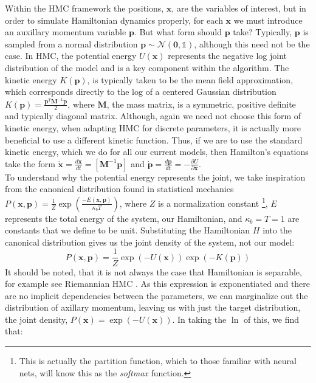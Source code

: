 \documentclass[twoside]{article}
\begin{document}
Within the HMC framework the positions, $\textbf{x}$, are the variables of interest, but in order to simulate Hamiltonian dynamics properly, for each $\textbf{x}$ we must introduce an auxillary momentum variable $\textbf{p}$. But what form should $\textbf{p}$ take? Typically, $\textbf{p}$ is sampled from a normal distribution $\textbf{p} \sim \mathcal{N}(\textbf{0}, \mathds{1})$, although this need not be the case. In HMC, the potential energy $U(\textbf{x})$ represents the negative log joint distribution of the model and is a key component within the algorithm.  The kinetic energy $K(\textbf{p})$, is typically taken to be the mean field approximation, which corresponds directly to the log of a centered Gaussian distribution $K(\textbf{p}) = \frac{\textbf{p}^{T} \textbf{M}^{-1} \textbf{p}}{2}$, where $\textbf{M}$, the mass matrix, is a symmetric, positive definite and typically diagonal matrix. Although, again we need not choose this form of kinetic energy, when adapting HMC for discrete parameters, it is actually more beneficial to use a different kinetic function\citep{nishimura2017discontinuous}. Thus, if we are to use the standard kinetic energy, which we do for all our current models, then Hamilton's equations take the form $
\dot{\textbf{x}} = \frac{d\textbf{x}}{dt} = [\textbf{M}^{-1}\textbf{p}]$ and $ \dot{\textbf{p}} = \frac{d\textbf{p}}{dt} = -\frac{\partial U}{\partial \textbf{x}}$.\\
To understand why the potential energy represents the joint, we take inspiration from the canonical distribution found in statistical mechanics
$P(\textbf{x},\textbf{p}) = \frac{1}{Z}\exp\left(\frac{-E(\textbf{x},\textbf{p})}{\kappa_{b}T}\right)$,
where $Z$ is a normalization constant \footnote{This is actually the partition function, which to those familiar with neural nets, will know this as the \textit{softmax} function. }, $E$ represents the total energy of the system, our Hamiltonian, and $\kappa_{b} = T = 1$ are constants that we define to be unit. Substituting the Hamiltonian $H$ into the canonical distribution gives us the joint density of the system, not our model:
\begin{equation}
P(\textbf{x},\textbf{p}) = \frac{1}{Z}\exp(-U(\textbf{x}))\exp(-K(\textbf{p})) 
\end{equation}
It should be noted, that it is not always the case that Hamiltonian is separable, for example see Riemannian HMC \citep{girolami2011riemann}. As this expression is exponentiated and there are no implicit dependencies between the parameters, we can marginalize out the distribution of axillary momentum, leaving us with just the target distribution, the joint density, $P(\textbf{x})  = \exp(-U(\textbf{x}))$. In taking the $\ln$ of this, we find that:
\end{document}
